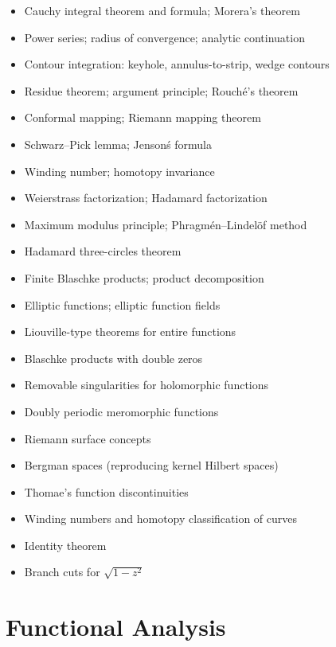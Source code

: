 \documentclass{amsart}
\begin{document}
\begin{itemize}
  \item Cauchy integral theorem and formula; Morera's theorem
  \item Power series; radius of convergence; analytic continuation
  \item Contour integration: keyhole, annulus-to-strip, wedge contours
  \item Residue theorem; argument principle; Rouch\'e's theorem
  \item Conformal mapping; Riemann mapping theorem
  \item Schwarz--Pick lemma; Jenson\'s formula
  \item Winding number; homotopy invariance
  \item Weierstrass factorization; Hadamard factorization
  \item Maximum modulus principle; Phragm\'en--Lindel\"of method
  \item Hadamard three-circles theorem
  \item Finite Blaschke products; product decomposition
  \item Elliptic functions; elliptic function fields
  \item Liouville-type theorems for entire functions
  \item Blaschke products with double zeros
  \item Removable singularities for holomorphic functions
  \item Doubly periodic meromorphic functions
  \item Riemann surface concepts
  \item Bergman spaces (reproducing kernel Hilbert spaces)
  \item Thomae's function discontinuities
  \item Winding numbers and homotopy classification of curves
  \item Identity theorem
  \item Branch cuts for $\sqrt{1-z^2}$
\end{itemize}

\section{Functional Analysis}
\end{document}
